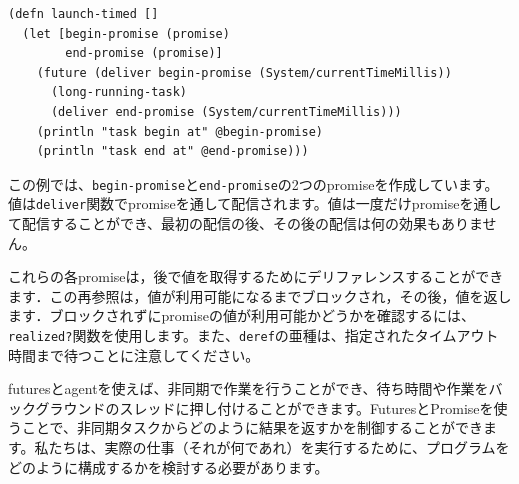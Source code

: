 \begin{lstlisting}[numbers=none]
(defn launch-timed []
  (let [begin-promise (promise)
        end-promise (promise)]
    (future (deliver begin-promise (System/currentTimeMillis))
      (long-running-task)
      (deliver end-promise (System/currentTimeMillis)))
    (println "task begin at" @begin-promise)
    (println "task end at" @end-promise)))
\end{lstlisting}

この例では、\texttt{begin-promise}と\texttt{end-promise}の2つのpromiseを作成しています。値は\texttt{deliver}関数でpromiseを通して配信されます。値は一度だけpromiseを通して配信することができ、最初の配信の後、その後の配信は何の効果もありません。

これらの各promiseは，後で値を取得するためにデリファレンスすることができます．この再参照は，値が利用可能になるまでブロックされ，その後，値を返します．ブロックされずにpromiseの値が利用可能かどうかを確認するには、\texttt{realized?}関数を使用します。また、\texttt{deref}の亜種は、指定されたタイムアウト時間まで待つことに注意してください。

futuresとagentを使えば、非同期で作業を行うことができ、待ち時間や作業をバックグラウンドのスレッドに押し付けることができます。FuturesとPromiseを使うことで、非同期タスクからどのように結果を返すかを制御することができます。私たちは、実際の仕事（それが何であれ）を実行するために、プログラムをどのように構成するかを検討する必要があります。